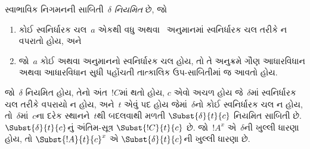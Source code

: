\begin{defn}
સ્વાભાવિક નિગમનની
સાબિતી~$\delta$
\emph{નિયમિત} છે, જો
\begin{enumerate}
  \item કોઈ સ્વનિર્ધારક ચલ~$a$
  એકથી વધુ \Elim{\lexists}
  અથવા~\Intro{\lforall}
  અનુમાનમાં સ્વનિર્ધારક ચલ
  તરીકે ન વપરાતો હોય, અને
  \item જો~$a$ કોઈ
  \Elim{\lexists} અથવા
  \Intro{\lforall} અનુમાનનો
  સ્વનિર્ધારક ચલ હોય,
  તો તે અનુક્રમે ગૌણ
  આધારવિધાન અથવા આધારવિધાન
  સુધી પહોંચતી તાત્કાલિક
  ઉપ-સાબિતીમાં જ આવતો હોય.
\end{enumerate}
\end{defn}

\begin{lem}
જો~$\delta$ નિયમિત હોય,
તેનો અંત~$!C$માં થતો હોય,
$c$ એવો અચળ હોય
જે~$\delta$માં સ્વનિર્ધારક
ચલ તરીકે વપરાયો ન હોય,
અને~$t$ એવું પદ હોય
જેમાં~$\delta$નો કોઈ
સ્વનિર્ધારક ચલ ન હોય,
તો~$\delta$માં~$c$ના
દરેક સ્થાનને~$t$થી
બદલવાથી મળતી
$\Subst{\delta}{t}{c}$
નિયમિત સાબિતી છે.
$\Subst{\delta}{t}{c}$નું
અંતિમ-સૂત્ર
$\Subst{!C}{t}{c}$ છે.
જો~$!A^x$ એ~$\delta$ની
ખુલ્લી ધારણા હોય, તો
$\Subst{!A}{t}{c}^x$ એ
$\Subst{\delta}{t}{c}$ની
ખુલ્લી ધારણા છે.
\end{lem}

